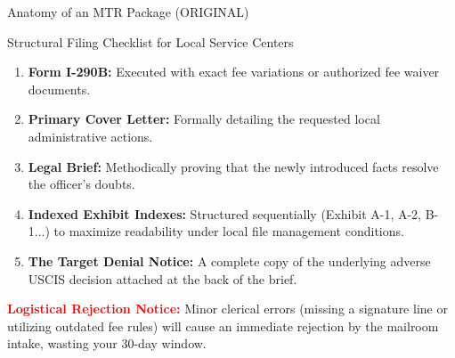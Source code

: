 \documentclass[11pt]{beamer}
\begin{document}
	\begin{frame}{Anatomy of an MTR Package (ORIGINAL)}
		\scriptsize
		\begin{block}{Structural Filing Checklist for Local Service Centers}
			\begin{enumerate}
				\item \textbf{Form I-290B:} Executed with exact fee variations or authorized fee waiver documents.
				\item \textbf{Primary Cover Letter:} Formally detailing the requested local administrative actions.
				\item \textbf{Legal Brief:} Methodically proving that the newly introduced facts resolve the officer's doubts.
				\item \textbf{Indexed Exhibit Indexes:} Structured sequentially (Exhibit A-1, A-2, B-1...) to maximize readability under local file management conditions.
				\item \textbf{The Target Denial Notice:} A complete copy of the underlying adverse USCIS decision attached at the back of the brief.
			\end{enumerate}
			\vspace{0.1in}
			\textcolor{red}{\textbf{Logistical Rejection Notice:}} Minor clerical errors (missing a signature line or utilizing outdated fee rules) will cause an immediate rejection by the mailroom intake, wasting your 30-day window.
		\end{block}
	\end{frame}
	
	
\end{document}
